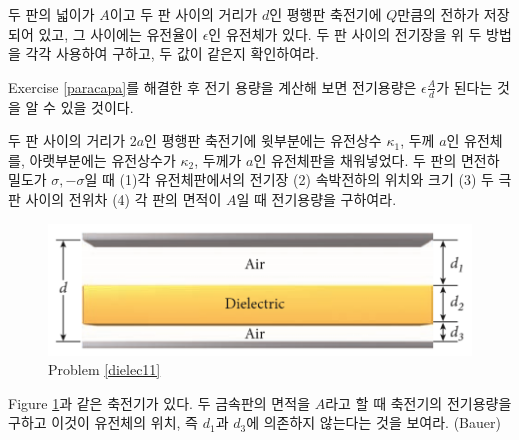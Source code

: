 \begin{exercise}\label{paracapa}
두 판의 넓이가 $A$이고 두 판 사이의 거리가 $d$인  평행판 축전기에 $Q$만큼의 전하가 저장되어 있고, 그 사이에는 유전율이 $\epsilon$인 유전체가 있다. 두 판 사이의 전기장을 위 두 방법을 각각 사용하여 구하고, 두 값이 같은지 확인하여라.
\end{exercise}
Exercise \ref{paracapa}를 해결한 후 전기 용량을 계산해 보면 전기용량은 $\epsilon\frac{A}{d}$가 된다는 것을 알 수 있을 것이다.

\begin{problem}
두 판 사이의 거리가 $2a$인 평행판 축전기에 윗부분에는 유전상수 $\kappa_1$, 두께 $a$인 유전체를, 아랫부분에는 유전상수가 $\kappa_2$, 두께가 $a$인 유전체판을 채워넣었다. 두 판의 면전하밀도가 $\sigma, -\sigma$일 때 (1)각 유전체판에서의 전기장 (2) 속박전하의 위치와 크기 (3) 두 극판 사이의 전위차 (4) 각 판의 면적이 $A$일 때 전기용량을 구하여라.
\end{problem}

\begin{problem}\label{dielec11}
\begin{figure}[h]
\centering\includegraphics[scale=0.4]{Pictures/dielec11.PNG}
\caption{Problem \ref{dielec11}}
\label{fig:dielec11} %
\end{figure}
Figure \ref{fig:dielec11}과 같은 축전기가 있다. 두 금속판의 면적을 $A$라고 할 때 축전기의 전기용량을 구하고 이것이 유전체의 위치, 즉 $d_1$과 $d_3$에 의존하지 않는다는 것을 보여라. (Bauer)
\end{problem}

